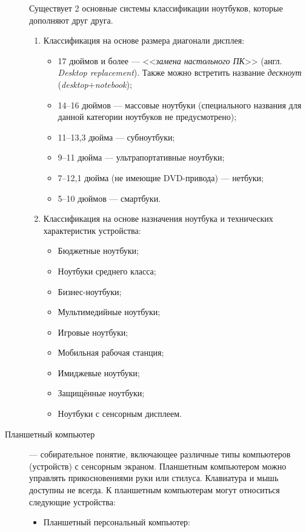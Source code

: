 \begin{description}
  Существует 2 основные системы классификации ноутбуков, которые дополняют друг друга.
  \begin{enumerate}
   \item Классификация на основе размера диагонали дисплея:
         \begin{itemize}
          \item 17 дюймов и более --- <<\emph{замена настольного ПК}>> (англ. \emph{Desktop replacement}). Также можно встретить название \emph{дескноут} (\emph{desktop}$+$\emph{notebook});
          \item 14--16 дюймов --- массовые ноутбуки (специального названия для данной категории ноутбуков не предусмотрено);
          \item 11--13,3 дюйма --- субноутбуки;
          \item 9--11 дюйма --- ультрапортативные ноутбуки;
          \item 7--12,1 дюйма (не имеющие DVD-привода) --- нетбуки;
          \item 5--10 дюймов --- смартбуки.
         \end{itemize}
   \item Классификация на основе назначения ноутбука и технических характеристик устройства:
         \begin{itemize}
          \item Бюджетные ноутбуки;
          \item Ноутбуки среднего класса;
          \item Бизнес-ноутбуки;
          \item Мультимедийные ноутбуки;
          \item Игровые ноутбуки;
          \item Мобильная рабочая станция;
          \item Имиджевые ноутбуки;
          \item Защищённые ноутбуки;
          \item Ноутбуки с сенсорным дисплеем.
         \end{itemize}
  \end{enumerate}
 \item[Планшетный компьютер] --- собирательное понятие, включающее различные типы компьютеров (устройств) с сенсорным экраном. Планшетным компьютером можно управлять прикосновениями руки или стилуса. Клавиатура и мышь доступны не всегда.
  К планшетным компьютерам могут относиться следующие устройства:
  \begin{itemize}
   \item Планшетный персональный компьютер:

\end{itemize}
\end{description}
